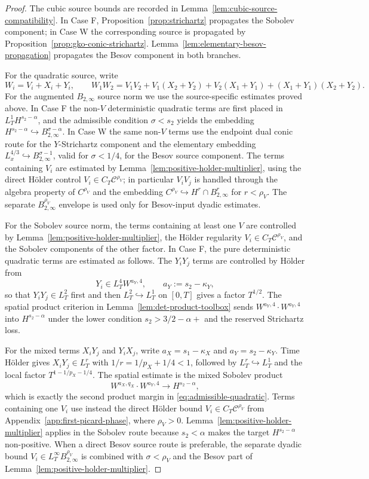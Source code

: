 \documentclass[10pt]{amsart}
\numberwithin{equation}{section}
\theoremstyle{plain}
\theoremstyle{definition}
\theoremstyle{remark}
\newcommand{\C}{\mathcal{C}}
\begin{document}
\begin{proof}
The cubic source bounds are recorded in Lemma~\ref{lem:cubic-source-compatibility}.  In Case F, Proposition~\ref{prop:strichartz} propagates the Sobolev component; in Case W the corresponding source is propagated by Proposition~\ref{prop:gko-conic-strichartz}.  Lemma~\ref{lem:elementary-besov-propagation} propagates the Besov component in both branches.

For the quadratic source, write
\[
        W_i=V_i+X_i+Y_i,
        \qquad
        W_1W_2=V_1V_2+V_1(X_2+Y_2)+V_2(X_1+Y_1)+(X_1+Y_1)(X_2+Y_2).
\]
For the augmented $B_{2,\infty}$ source norm we use the source-specific estimates proved above.  In Case F the non-$V$ deterministic quadratic terms are first placed in $L_T^1H^{s_2-\alpha}$, and the admissible condition $\sigma<s_2$ yields the embedding $H^{s_2-\alpha}\hookrightarrow B_{2,\infty}^{\sigma-\alpha}$.  In Case W the same non-$V$ terms use the endpoint dual conic route for the $Y$-Strichartz component and the elementary embedding $L^{4/3}_x\hookrightarrow B_{2,\infty}^{\sigma-1}$, valid for $\sigma<1/4$, for the Besov source component.  The terms containing $V_i$ are estimated by Lemma~\ref{lem:positive-holder-multiplier}, using the direct H\"older control $V_i\in C_T\C^{\rho_V}$; in particular $V_iV_j$ is handled through the algebra property of $C^{\rho_V}$ and the embedding $C^{\rho_V}\hookrightarrow H^r\cap B_{2,\infty}^r$ for $r<\rho_V$.  The separate $B_{2,\infty}^{\rho_V}$ envelope is used only for Besov-input dyadic estimates.

For the Sobolev source norm, the terms containing at least one $V$ are controlled by Lemma~\ref{lem:positive-holder-multiplier}, the H\"older regularity $V_i\in C_T\C^{\rho_V}$, and the Sobolev components of the other factor.  In Case F, the pure deterministic quadratic terms are estimated as follows.  The $Y_iY_j$ terms are controlled by H\"older from
\[
        Y_i\in L_T^4W^{a_Y,4},
        \qquad a_Y:=s_2-\kappa_Y,
\]
so that $Y_iY_j\in L_T^2$ first and then $L_T^2\hookrightarrow L_T^1$ on $[0,T]$ gives a factor $T^{1/2}$.  The spatial product criterion in Lemma~\ref{lem:det-product-toolbox} sends $W^{a_Y,4}\cdot W^{a_Y,4}$ into $H^{s_2-\alpha}$ under the lower condition $s_2>3/2-\alpha+$ and the reserved Strichartz loss.

For the mixed terms $X_iY_j$ and $Y_iX_j$, write $a_X=s_1-\kappa_X$ and $a_Y=s_2-\kappa_Y$.  Time H\"older gives $X_iY_j\in L_T^r$ with $1/r=1/p_X+1/4<1$, followed by $L_T^r\hookrightarrow L_T^1$ and the local factor $T^{1-1/p_X-1/4}$.  The spatial estimate is the mixed Sobolev product
\[
        W^{a_X,q_X}\cdot W^{a_Y,4}\longrightarrow H^{s_2-\alpha},
\]
which is exactly the second product margin in \eqref{eq:admissible-quadratic}.  Terms containing one $V_i$ use instead the direct H\"older bound $V_i\in C_T\C^{\rho_V}$ from Appendix~\ref{app:first-picard-phase}, where $\rho_V>0$.  Lemma~\ref{lem:positive-holder-multiplier} applies in the Sobolev route because $s_2<\alpha$ makes the target $H^{s_2-\alpha}$ non-positive.  When a direct Besov source route is preferable, the separate dyadic bound $V_i\in L_T^\infty B_{2,\infty}^{\rho_V}$ is combined with $\sigma<\rho_V$ and the Besov part of Lemma~\ref{lem:positive-holder-multiplier}.


\end{proof}
\end{document}
